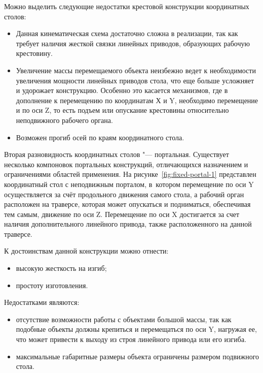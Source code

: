 Можно выделить следующие недостатки крестовой конструкции координатных столов:

\begin{itemize}
	\item Данная кинематическая схема достаточно сложна в реализации, так как требует наличия жесткой связки линейных приводов, образующих рабочую крестовину.
	\item Увеличение массы перемещаемого объекта неизбежно ведет к необходимости увеличения мощности линейных приводов стола, что еще больше усложняет и удорожает конструкцию. Особенно это касается механизмов, где в дополнение к перемещению по координатам Х и Y, необходимо перемещение и по оси Z, то есть подъем или опускание крестовины относительно неподвижного рабочего органа. 
	\item Возможен прогиб осей по краям координатного стола.
\end{itemize}

Вторая разновидность координатных столов "--- портальная. Существует несколько компоновок портальных конструкций, отличающихся назначением и ограничениями областей применения. На рисунке~\cref{fig:fixed-portal-1} представлен координатный стол с неподвижным порталом, в~котором перемещение по оси Y осуществляется за счёт продольного движения самого стола, а рабочий орган расположен на траверсе, которая может опускаться и подниматься, обеспечивая тем самым, движение по оси Z. Перемещение по оси X достигается за счет наличия дополнительного линейного привода, также расположенного на данной траверсе.

К достоинствам данной конструкции можно отнести:

\begin{itemize}
	\item высокую жесткость на изгиб;
	\item простоту изготовления.
\end{itemize}

Недостатками являются:

\begin{itemize}
	\item отсутствие возможности работы с объектами большой массы, так как подобные объекты должны крепиться и перемещаться по оси Y, нагружая ее, что может привести к выходу из строя линейного привода или его изгиба.
	\item максимальные габаритные размеры объекта ограничены размером подвижного стола.	
\end{itemize}


